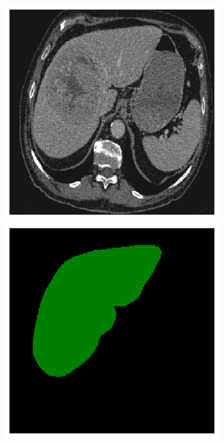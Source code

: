 {\begin{figure}[!ht]
\begin{mdframed}[backgroundcolor=blue!50,linecolor=blue!50]
\begin{minipage}{4cm}
		\includegraphics[width=\linewidth]{images/LiverVE_Raw_Pat1_12}
	\end{minipage} \hspace{-0.3cm}
	\begin{minipage}{4cm}
		\includegraphics[width=\linewidth]{images/LiverVE_GT_Pat1_12}

\end{minipage}
\end{mdframed}
\end{figure}}

